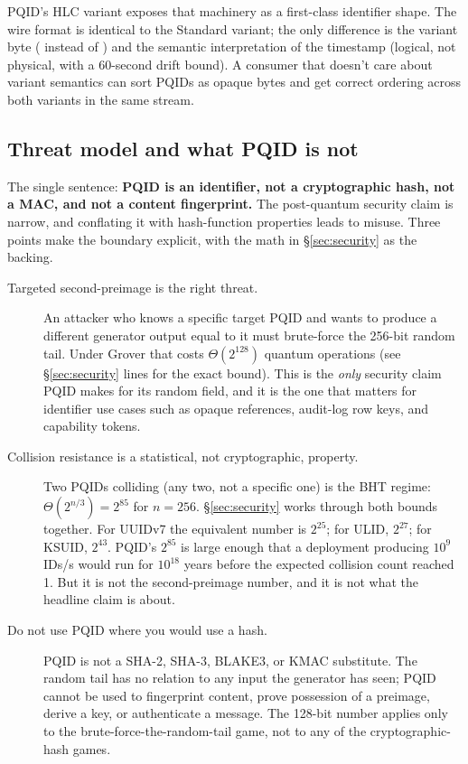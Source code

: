 PQID's HLC variant exposes that machinery as a first-class identifier shape. The wire format is identical to the Standard variant; the only difference is the variant byte ( instead of ) and the semantic interpretation of the timestamp (logical, not physical, with a 60-second drift bound). A consumer that doesn't care about variant semantics can sort PQIDs as opaque bytes and get correct ordering across both variants in the same stream.

\subsection{Threat model and what PQID is not}
\label{sec:threat-model}

The single sentence: \textbf{PQID is an identifier, not a cryptographic hash, not a MAC, and not a content fingerprint.} The post-quantum security claim is narrow, and conflating it with hash-function properties leads to misuse. Three points make the boundary explicit, with the math in \S\ref{sec:security} as the backing.

\begin{description}
  \item[Targeted second-preimage is the right threat.] An attacker who knows a specific target PQID and wants to produce a different generator output equal to it must brute-force the 256-bit random tail. Under Grover \citep{grover1996} that costs $\Theta(2^{128})$ quantum operations (see \S\ref{sec:security} lines for the exact bound). This is the \emph{only} security claim PQID makes for its random field, and it is the one that matters for identifier use cases such as opaque references, audit-log row keys, and capability tokens.

  \item[Collision resistance is a statistical, not cryptographic, property.] Two PQIDs colliding (any two, not a specific one) is the BHT \citep{bht1998} regime: $\Theta(2^{n/3}) = 2^{85}$ for $n = 256$. \S\ref{sec:security} works through both bounds together. For UUIDv7 the equivalent number is $2^{25}$; for ULID, $2^{27}$; for KSUID, $2^{43}$. PQID's $2^{85}$ is large enough that a deployment producing $10^9$ IDs/s would run for $10^{18}$ years before the expected collision count reached 1. But it is not the second-preimage number, and it is not what the headline claim is about.

  \item[Do not use PQID where you would use a hash.] PQID is not a SHA-2, SHA-3, BLAKE3, or KMAC substitute. The random tail has no relation to any input the generator has seen; PQID cannot be used to fingerprint content, prove possession of a preimage, derive a key, or authenticate a message. The 128-bit number applies only to the brute-force-the-random-tail game, not to any of the cryptographic-hash games.
\end{description}

